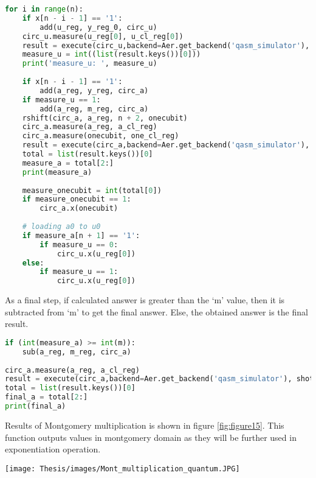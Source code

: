 \documentclass{cpp}
\begin{document}
\begin{lstlisting}[language=Python]
for i in range(n):
    if x[n - i - 1] == '1':            
        add(u_reg, y_reg_0, circ_u)
    circ_u.measure(u_reg[0], u_cl_reg[0])  
    result = execute(circ_u,backend=Aer.get_backend('qasm_simulator'), shots=1).result().get_counts(circ_u)
    measure_u = int((list(result.keys())[0]))
    print('measure_u: ', measure_u)
   
    if x[n - i - 1] == '1':
        add(a_reg, y_reg, circ_a)
    if measure_u == 1:
        add(a_reg, m_reg, circ_a)
    rshift(circ_a, a_reg, n + 2, onecubit)
    circ_a.measure(a_reg, a_cl_reg)
    circ_a.measure(onecubit, one_cl_reg)
    result = execute(circ_a,backend=Aer.get_backend('qasm_simulator'), shots=1).result().get_counts(circ_a)
    total = list(result.keys())[0]    
    measure_a = total[2:]
    print(measure_a)
   
    measure_onecubit = int(total[0])
    if measure_onecubit == 1:
        circ_a.x(onecubit)    
   
    # loading a0 to u0
    if measure_a[n + 1] == '1':
        if measure_u == 0:
            circ_u.x(u_reg[0])
    else:
        if measure_u == 1:
            circ_u.x(u_reg[0])
\end{lstlisting}

As a final step, if calculated answer is greater than the ‘m’ value, then it is subtracted from ‘m’ to get the final answer. Else, the obtained answer is the final result. 

\begin{lstlisting}[language=Python]
if (int(measure_a) >= int(m)):
    sub(a_reg, m_reg, circ_a)
   
circ_a.measure(a_reg, a_cl_reg)
result = execute(circ_a,backend=Aer.get_backend('qasm_simulator'), shots=1).result().get_counts(circ_a)
total = list(result.keys())[0]    
final_a = total[2:]
print(final_a)
\end{lstlisting}

Results of Montgomery multiplication is shown in figure \ref{fig:figure15}. This function outputs values in montgomery domain as they will be further used in exponentiation operation.

\begin{figure*}[htp]
    \centering
    \texttt{[image: Thesis/images/Mont\_multiplication\_quantum.JPG]}
    \caption{Results for Montgomery modular multiplication using Qiskit}
    \label{fig:figure15}
\end{figure*}
\end{document}

